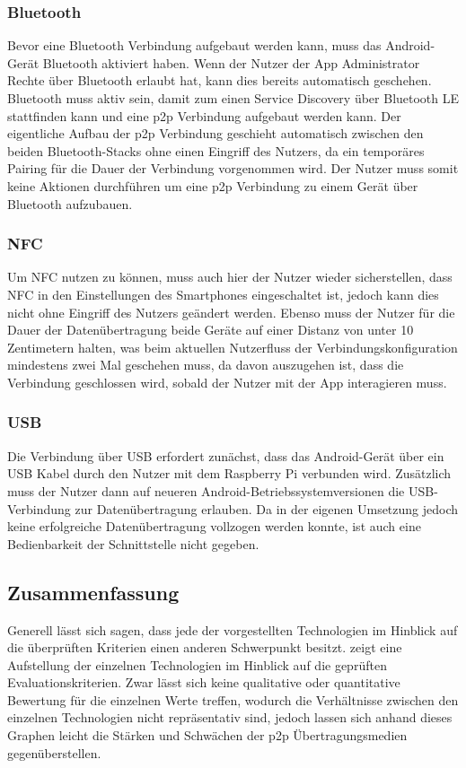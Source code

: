 		\subsubsection{Bluetooth} Bevor eine Bluetooth Verbindung aufgebaut werden kann, muss das Android-Gerät Bluetooth aktiviert haben. Wenn der Nutzer der App Administrator Rechte über Bluetooth erlaubt hat, kann dies bereits automatisch geschehen. Bluetooth muss aktiv sein, damit zum einen Service Discovery über Bluetooth LE stattfinden kann und eine p2p Verbindung aufgebaut werden kann. Der eigentliche Aufbau der p2p Verbindung geschieht automatisch zwischen den beiden Bluetooth-Stacks ohne einen Eingriff des Nutzers, da  ein temporäres Pairing für die Dauer der Verbindung vorgenommen wird. Der Nutzer muss somit keine Aktionen durchführen um eine p2p Verbindung zu einem Gerät über Bluetooth aufzubauen.
		
		\subsubsection{NFC} Um NFC nutzen zu können, muss auch hier der Nutzer wieder sicherstellen, dass NFC in den Einstellungen des Smartphones eingeschaltet ist, jedoch kann dies nicht ohne Eingriff des Nutzers geändert werden. Ebenso muss der Nutzer für die Dauer der Datenübertragung beide Geräte auf einer Distanz von unter 10 Zentimetern halten, was beim aktuellen Nutzerfluss der Verbindungskonfiguration mindestens zwei Mal geschehen muss, da davon auszugehen ist, dass die Verbindung geschlossen wird, sobald der Nutzer mit der App interagieren muss.
		
           \subsubsection{USB} Die Verbindung über USB erfordert zunächst, dass das Android-Gerät über ein USB Kabel durch den Nutzer mit dem Raspberry Pi verbunden wird. Zusätzlich muss der Nutzer dann auf neueren Android-Betriebssystemversionen die USB-Verbindung zur Datenübertragung erlauben. Da in der eigenen Umsetzung jedoch keine erfolgreiche Datenübertragung vollzogen werden konnte, ist auch eine Bedienbarkeit der Schnittstelle nicht gegeben.
		
		\subsection{Zusammenfassung}

		Generell lässt sich sagen, dass jede der vorgestellten Technologien im Hinblick auf die überprüften Kriterien einen anderen Schwerpunkt besitzt.  zeigt eine Aufstellung der einzelnen Technologien im Hinblick auf die geprüften Evaluationskriterien. Zwar lässt sich keine qualitative oder quantitative Bewertung für die einzelnen Werte treffen, wodurch die Verhältnisse zwischen den einzelnen Technologien nicht repräsentativ sind, jedoch lassen sich anhand dieses Graphen leicht die Stärken und Schwächen der p2p Übertragungsmedien gegenüberstellen.
		
